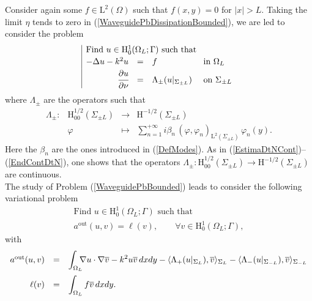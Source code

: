 \documentclass[11pt,a4paper]{report}
\newcommand{\dsp}{\displaystyle}
\newcommand{\Om}{\Omega}
\newcommand{\mrm}[1]{\mathrm{#1}}
\newcommand{\mL}{\mrm{L}}
\newcommand{\mH}{\mrm{H}}
\begin{document}
Consider again some $f\in\mL^2(\Om)$ such that $f(x,y)=0$ for $|x|>L$. Taking the limit $\eta$ tends to zero in (\ref{WaveguidePbDissipationBounded}), we are led to consider the problem 
\begin{equation}\label{WaveguidePbBounded}
\begin{array}{|rcll}
\multicolumn{4}{|l}{\mbox{Find }u\in\mH^1_0(\Om_L;\Gamma)\mbox{ such that }}\\[2pt]
-\Delta u-k^2u&=&f&\mbox{ in }\Om_L \\[2pt]
\cfrac{\partial u}{\partial \nu} & = & \Lambda_\pm(u|_{\Sigma_{\pm L}}) &\mbox{ on }\Sigma_{\pm L}
\end{array}
\end{equation} 
where $\Lambda_\pm$ are the operators such that
\begin{equation}\label{DefDTN}
\begin{array}{lrcl}
\Lambda_\pm:& \mH^{1/2}_{00}(\Sigma_{\pm L}) & \to& \mH^{-1/2}(\Sigma_{\pm L}) \\[6pt]
 & \varphi & \mapsto  & \dsp\sum_{n=1}^{+\infty} i\beta_n\, (\varphi,\varphi_n)_{\mL^2(\Sigma_{\pm L})}\,\varphi_n(y).
\end{array}
\end{equation}
Here the $\beta_n$ are the ones introduced in (\ref{DefModes}). As in (\ref{EstimaDtNCont})--(\ref{EndContDtN}), one shows that the operators $\Lambda_\pm: \mH^{1/2}_{00}(\Sigma_{\pm L})  \to \mH^{-1/2}(\Sigma_{\pm L})$ are continuous.\\
\newline
The study of Problem (\ref{WaveguidePbBounded}) leads to consider the following variational problem 
\begin{equation}\label{PbNumBounded}
\begin{array}{|l}
\mbox{Find }u\in\mH^1_0(\Om_L;\Gamma) \mbox{ such that }\\[3pt]
a^{\mrm{out}}(u,v)=\ell(v),\qquad \forall v\in\mH^1_0(\Om_L;\Gamma),
\end{array}
\end{equation}
with 
\begin{equation}\label{DefForms}
\begin{array}{rcl}
a^{\mrm{out}}(u,v)&=&\dsp\int_{\Om_L}\hspace{-0.2cm}\nabla u\cdot\nabla\overline{v}-k^2 u\overline{v}\,dxdy-\langle\Lambda_+(u|_{\Sigma_{L}}),\overline{v} \rangle_{\Sigma_L}-\langle\Lambda_-(u|_{\Sigma_{-L}}),\overline{v} \rangle_{\Sigma_{-L}}\\[12pt]
\ell(v)&=&\dsp\int_{\Om_L}f\overline{v}\,dxdy.
\end{array}
\end{equation}
\end{document}
